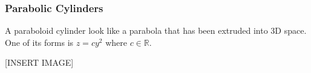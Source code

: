 \subsubsection{Parabolic Cylinders}
\noindent
A paraboloid cylinder look like a parabola that has been extruded into 3D space. One of its forms is $z = cy^2$ where $c \in \mathbb{R}$.

[INSERT IMAGE]